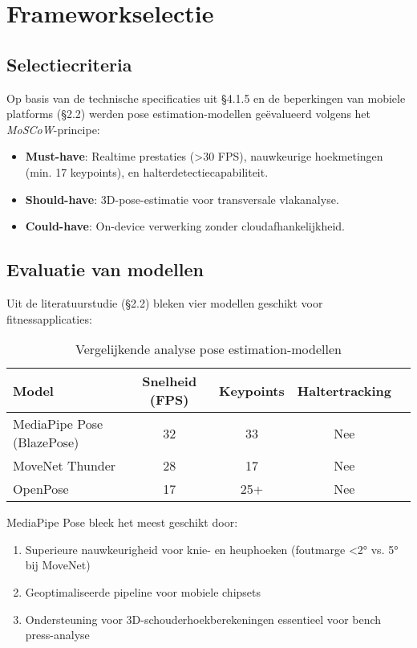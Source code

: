 \section{Frameworkselectie}
\subsection{Selectiecriteria}

Op basis van de technische specificaties uit §4.1.5 en de beperkingen van mobiele platforms (§2.2) werden pose estimation-modellen geëvalueerd volgens het \textit{MoSCoW}-principe:

\begin{itemize}
\item \textbf{Must-have}: Realtime prestaties (>30 FPS), nauwkeurige hoekmetingen (min. 17 keypoints), en halterdetectiecapabiliteit.
\item \textbf{Should-have}: 3D-pose-estimatie voor transversale vlakanalyse.
\item \textbf{Could-have}: On-device verwerking zonder cloudafhankelijkheid.
\end{itemize}

\subsection{Evaluatie van modellen}

Uit de literatuurstudie (§2.2) bleken vier modellen geschikt voor fitnessapplicaties:

\begin{table}[h]
    \centering
    \caption{Vergelijkende analyse pose estimation-modellen}
    \begin{tabular}{lcccl}
    \toprule
    Model & Snelheid (FPS) & Keypoints & Haltertracking \\
    \midrule
    MediaPipe Pose (BlazePose) & 32 & 33 & Nee \\
    MoveNet Thunder & 28 & 17 & Nee \\
    OpenPose & 17 & 25+ & Nee \\  %
    \bottomrule
    \end{tabular}
    \label{tab:pose_models}  %
    \end{table}

MediaPipe Pose bleek het meest geschikt door:
\begin{enumerate}
\item Superieure nauwkeurigheid voor knie- en heuphoeken (foutmarge <2° vs. 5° bij MoveNet)
\item Geoptimaliseerde pipeline voor mobiele chipsets 
\item Ondersteuning voor 3D-schouderhoekberekeningen essentieel voor bench press-analyse 
\end{enumerate}

